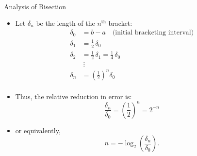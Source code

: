 \documentclass[10pt]{beamer}
\begin{document}



\begin{frame}[shrink]{Analysis of Bisection}
\begin{itemize}
    \item  Let \(\delta_n\) be the length of the \(n^{\text{th}}\) bracket:
\begin{align*}
    \delta_0 &= b - a \quad \text{(initial bracketing interval)}  \\
    \delta_1 &= \frac{1}{2}\,\delta_0 \\
    \delta_2 &= \frac{1}{2}\,\delta_1 = \frac{1}{4}\,\delta_0 \\
             &\ \vdots \\
    \delta_n &= \left( \frac{1}{2} \right)^n \delta_0 \\
\end{align*}
\item  Thus, the relative reduction in error is:
\[
    \frac{\delta_n}{\delta_0} = \left( \frac{1}{2} \right)^n = 2^{-n}
\]
\item or equivalently,
\[
    n = -\log_2 \left( \frac{\delta_n}{\delta_0} \right).
\]
\end{itemize}
\end{frame}

\end{document}
